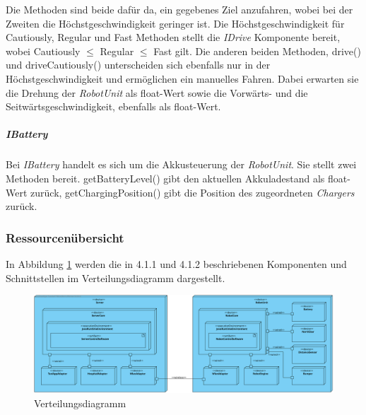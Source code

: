     		Die Methoden sind beide dafür da, ein gegebenes Ziel anzufahren, wobei bei der Zweiten die Höchstgeschwindigkeit geringer ist.
    		 Die Höchstgeschwindigkeit für Cautiously, Regular und Fast Methoden stellt die \emph{IDrive} Komponente bereit, wobei Cautiously $\leq$ Regular $\leq$ Fast gilt.
    		 Die anderen beiden Methoden, drive() und driveCautiously() unterscheiden sich ebenfalls nur in der Höchstgeschwindigkeit und ermöglichen ein manuelles Fahren.
    		 Dabei erwarten sie die Drehung der \emph{RobotUnit} als float-Wert sowie die Vorwärts- und die Seitwärtsgeschwindigkeit, ebenfalls als float-Wert.
    	\subparagraph{IBattery}\label{ibattery}
    		Bei \emph{IBattery} handelt es sich um die Akkusteuerung der \emph{RobotUnit}.
    		Sie stellt zwei Methoden bereit.
    		getBatteryLevel() gibt den aktuellen Akkuladestand als float-Wert zurück, getChargingPosition() gibt die Position des zugeordneten \emph{Chargers} zurück.


\pagebreak
\subsubsection{Ressourcenübersicht}
    In Abbildung \ref{fig:4-1-3-verteilungsdiagramm} werden die in 4.1.1 und 4.1.2 beschriebenen
    Komponenten und Schnittstellen im Verteilungsdiagramm dargestellt.

    \begin{figure}[H]
      \centering
      \includegraphics[width=1.2\textwidth, angle=90]{img/2-Analyse-4-Produktumgebung}
      \caption{Verteilungsdiagramm}
      \label{fig:4-1-3-verteilungsdiagramm}
    \end{figure}
